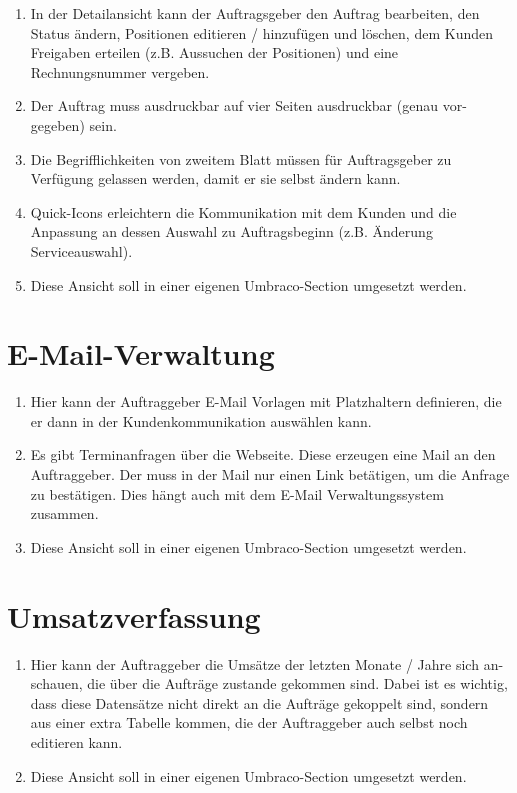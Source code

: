 \begin{enumerate}
	\item In der Detailansicht kann der Auftragsgeber den Auftrag bearbeiten, den Status ändern, Positionen editieren / hinzufügen und löschen, dem Kunden Freigaben erteilen (z.B. Aussuchen der Positionen) und eine Rechnungsnummer vergeben.
	\item Der Auftrag muss ausdruckbar auf vier Seiten ausdruckbar (genau vor-gegeben) sein.
	\item Die Begrifflichkeiten von zweitem Blatt müssen für Auftragsgeber zu Verfügung gelassen werden, damit er sie selbst ändern kann.
	\item Quick-Icons erleichtern die Kommunikation mit dem Kunden und die Anpassung an dessen Auswahl zu Auftragsbeginn (z.B. Änderung Serviceauswahl).
	\item Diese Ansicht soll in einer eigenen Umbraco-Section umgesetzt werden.
\end{enumerate} 


\section{E-Mail-Verwaltung}

\begin{enumerate}
	\item Hier kann der Auftraggeber E-Mail Vorlagen mit Platzhaltern definieren, die er dann in der Kundenkommunikation auswählen kann.
	\item Es gibt Terminanfragen über die Webseite. Diese erzeugen eine Mail an den Auftraggeber. Der muss in der Mail nur einen Link betätigen, um die Anfrage zu bestätigen. Dies hängt auch mit dem E-Mail Verwaltungssystem zusammen.
	\item Diese Ansicht soll in einer eigenen Umbraco-Section umgesetzt werden.
\end{enumerate} 



\section{Umsatzverfassung}
\begin{enumerate}
	\item Hier kann der Auftraggeber die Umsätze der letzten Monate / Jahre sich an-schauen, die über die Aufträge zustande gekommen sind. Dabei ist es wichtig, dass diese Datensätze nicht direkt an die Aufträge gekoppelt sind, sondern aus einer extra Tabelle kommen, die der Auftraggeber auch selbst noch editieren kann.
	\item Diese Ansicht soll in einer eigenen Umbraco-Section umgesetzt werden.
\end{enumerate} 


